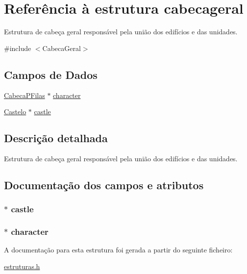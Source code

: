 \hypertarget{structcabecageral}{\section{\-Referência à estrutura cabecageral}
\label{structcabecageral}
}


\-Estrutura de cabeça geral responsável pela união dos edifícios e das unidades.  




{\ttfamily \#include $<$\-Cabeca\-Geral$>$}

\subsection*{\-Campos de \-Dados}
\begin{DoxyCompactItemize}
\item 
\hyperlink{estruturas_8h_ae7404ad1121a2b107c66d58cb1ba39bf}{\-Cabeca\-P\-Filas} $\ast$ \hyperlink{structcabecageral_a40aa7397f92075ac0d1b5e4ae0032d5a}{character}
\item 
\hyperlink{estruturas_8h_ab5ee034a420e0a105cf07abdd6c06177}{\-Castelo} $\ast$ \hyperlink{structcabecageral_a6284859843d67ddfb1d33b460a7a7c86}{castle}
\end{DoxyCompactItemize}


\subsection{\-Descrição detalhada}
\-Estrutura de cabeça geral responsável pela união dos edifícios e das unidades. 

\subsection{\-Documentação dos campos e atributos}
\hypertarget{structcabecageral_a6284859843d67ddfb1d33b460a7a7c86}{
\subsubsection[{castle}]{$\ast$ {\bf castle}}}\label{structcabecageral_a6284859843d67ddfb1d33b460a7a7c86}
\hypertarget{structcabecageral_a40aa7397f92075ac0d1b5e4ae0032d5a}{
\subsubsection[{character}]{$\ast$ {\bf character}}}\label{structcabecageral_a40aa7397f92075ac0d1b5e4ae0032d5a}


\-A documentação para esta estrutura foi gerada a partir do seguinte ficheiro\-:\begin{DoxyCompactItemize}
\item 
\hyperlink{estruturas_8h}{estruturas.\-h}\end{DoxyCompactItemize}
